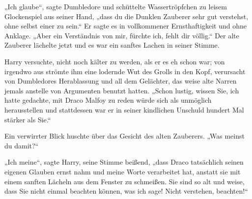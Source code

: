„Ich glaube“, sagte Dumbledore und schüttelte Wassertröpfchen zu leisem Glockenspiel aus seiner Hand, „dass du die Dunklen Zauberer sehr gut verstehst, ohne selbst einer zu sein.“ Er sagte es in vollkommener Ernsthaftigkeit und ohne Anklage. „Aber ein Verständnis von mir, fürchte ich, fehlt dir völlig.“ Der alte Zauberer lächelte jetzt und es war ein sanftes Lachen in seiner Stimme.

Harry versuchte, nicht noch kälter zu werden, als er es eh schon war; von irgendwo aus strömte ihm eine lodernde Wut des Grolls in den Kopf, verursacht von Dumbledores Herablassung und all dem Gelächter, das weise alte Narren jemals anstelle von Argumenten benutzt hatten. „Schon lustig, wissen Sie, ich hatte gedachte, mit Draco Malfoy zu reden würde sich als unmöglich herausstellen und stattdessen war er in seiner kindlichen Unschuld hundert Mal stärker als Sie.“

Ein verwirrter Blick huschte über das Gesicht des alten Zauberers. „Was meinst du damit?“

„Ich meine“, sagte Harry, seine Stimme beißend, „dass Draco tatsächlich seinen eigenen Glauben ernst nahm und meine Worte verarbeitet hat, anstatt sie mit einem sanften Lächeln aus dem Fenster zu schmeißen. Sie sind so alt und weise, dass Sie nicht einmal beachten können, was ich sage! Nicht verstehen, beachten!“

